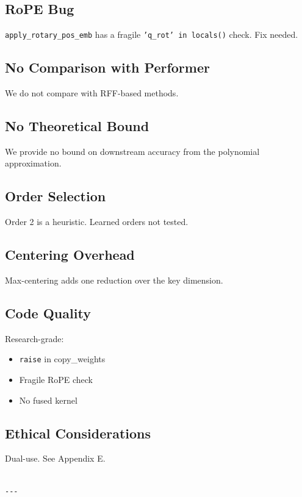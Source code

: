 \subsection{RoPE Bug}

\texttt{apply\_rotary\_pos\_emb} has a fragile \texttt{'q\_rot' in locals()} check. Fix needed.

\subsection{No Comparison with Performer}

We do not compare with RFF-based methods.

\subsection{No Theoretical Bound}

We provide no bound on downstream accuracy from the polynomial approximation.

\subsection{Order Selection}

Order 2 is a heuristic. Learned orders not tested.

\subsection{Centering Overhead}

Max-centering adds one reduction over the key dimension.

\subsection{Code Quality}

Research-grade:
\begin{itemize}
\item \texttt{raise} in copy\_weights
\item Fragile RoPE check
\item No fused kernel

\end{itemize}
\subsection{Ethical Considerations}

Dual-use. See Appendix E.
\begin{lstlisting}

---
\end{lstlisting}